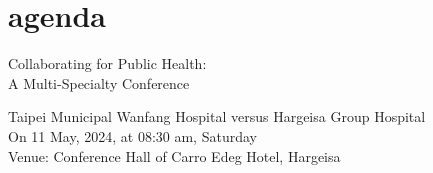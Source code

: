 \section{agenda}

\begin{center} %
    
\begin{tikzfigure}[]


\hspace{2cm}
%

\end{tikzfigure}

\end{center}


\fontsize{20}{24}  Collaborating for Public Health: \\
A Multi-Specialty Conference \\
 \par
\vspace{0.3cm}

\fontsize{12}{13} \sc
Taipei Municipal Wanfang Hospital versus Hargeisa Group Hospital\\
On 11 May, 2024, at 08:30 am, Saturday \\
Venue: Conference Hall of Carro Edeg Hotel, Hargeisa
\par






